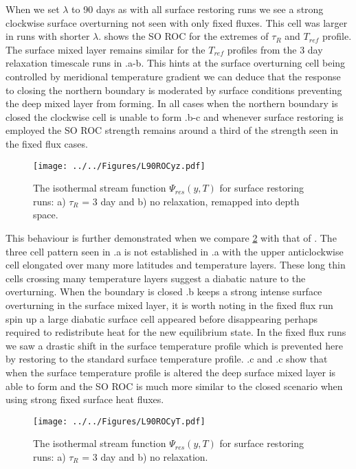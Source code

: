 When we set $\lambda $ to 90 days as with all surface restoring runs we see a strong clockwise surface overturning not seen with only fixed fluxes. This cell was larger in runs with shorter $\lambda $.   shows the SO ROC for the extremes of $\tau_R$ and $T_{ref}$ profile. The surface mixed layer remains similar for the $T_{ref}$ profiles from the 3 day relaxation timescale runs in .a-b. This hints at the surface overturning cell being controlled by meridional temperature gradient we can deduce that the response to closing the northern boundary is moderated by surface conditions preventing the deep mixed layer from forming. In all cases when the northern boundary is closed the clockwise cell is unable to form .b-c and whenever surface restoring is employed the SO ROC strength remains around a third of the strength seen in the fixed flux cases. 

\begin{figure}[H]
\center
\noindent \texttt{[image: ../../Figures/L90ROCyz.pdf]}
\caption{The isothermal stream function $\Psi_{res}(y,T)$ for surface restoring runs: a) $\tau _R$ = 3 day and b) no relaxation, remapped into depth space.}
\label{fig:L90rocyz}
\end{figure}

This behaviour is further demonstrated when we compare \ref{fig:L90rocyT} with that of . The three cell pattern seen in .a is not established in .a with the upper anticlockwise cell elongated over many more latitudes and temperature layers. These long thin cells crossing many temperature layers suggest a diabatic nature to the overturning. When the boundary is closed .b keeps a strong intense surface overturning in the surface mixed layer, it is worth noting in the fixed flux run spin up a large diabatic surface cell appeared before disappearing perhaps required to redistribute heat for the new equilibrium state. In the fixed flux runs we saw a drastic shift in the surface temperature profile which is prevented here by restoring to the standard surface temperature profile. .c and  .c show that when the surface temperature profile is altered the deep surface mixed layer is able to form and the SO ROC is much more similar to the closed scenario when using strong fixed surface heat fluxes.
\begin{figure}[H]
\center
\noindent \texttt{[image: ../../Figures/L90ROCyT.pdf]}
\caption{The isothermal stream function $\Psi_{res}(y,T)$ for surface restoring runs: a) $\tau _R$ = 3 day and b) no relaxation.}
\label{fig:L90rocyT}
\end{figure}

